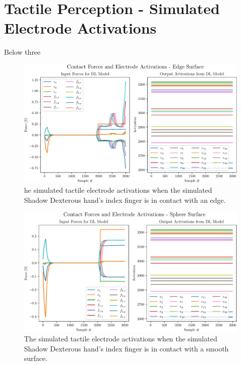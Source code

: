 \chapter{Tactile Perception - Simulated Electrode Activations} \label{tactile-perception-simulated-electrode-activations}

Below three 

\begin{figure}[h]
	\begin{center}
		\includegraphics[width=\textwidth]{chapters/1-tactile-perception/fig/edge-contact-graph.pdf}
	\end{center}
	\caption{he simulated tactile electrode activations when the simulated Shadow Dexterous hand's index finger is in contact with an edge.}
	\label{app:edge-contact-graph}
\end{figure}

\begin{figure}[h]
	\begin{center}
		\includegraphics[width=\textwidth]{chapters/1-tactile-perception/fig/sphere-contact-graph.pdf}
	\end{center}
	\caption{The simulated tactile electrode activations when the simulated Shadow Dexterous hand's index finger is in contact with a smooth surface.}
	\label{app:smooth-contact-graph}
\end{figure}

